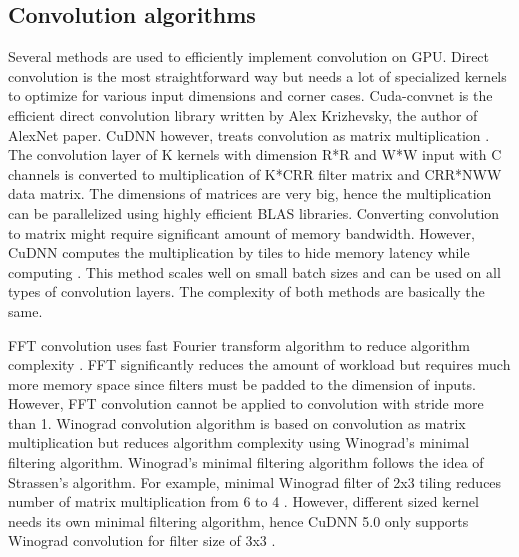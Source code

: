 \documentclass[conference]{IEEEtran}
\begin{document}
\subsection{Convolution algorithms}
Several methods are used to efficiently implement convolution on GPU.
Direct convolution is the most straightforward way but needs a lot of specialized kernels to optimize for various input dimensions and corner cases.
Cuda-convnet \cite{} is the efficient direct convolution library written by Alex Krizhevsky, the author of AlexNet paper.
CuDNN however, treats convolution as matrix multiplication \cite{}.
The convolution layer of K kernels with dimension R*R and W*W input with C channels is converted to multiplication of K*CRR filter matrix and CRR*NWW data matrix.
The dimensions of matrices are very big, hence the multiplication can be parallelized using highly efficient BLAS libraries.
Converting convolution to matrix might require significant amount of memory bandwidth.
However, CuDNN computes the multiplication by tiles to hide memory latency while computing \cite{}.
This method scales well on small batch sizes and can be used on all types of convolution layers.
The complexity of both methods are basically the same.

FFT convolution uses fast Fourier transform algorithm to reduce algorithm complexity \cite{}.
FFT significantly reduces the amount of workload but requires much more memory space since filters must be padded to the dimension of inputs.
However, FFT convolution cannot be applied to convolution with stride more than 1.
Winograd convolution algorithm is based on convolution as matrix multiplication but reduces algorithm complexity using Winograd's minimal filtering algorithm.
Winograd’s minimal filtering algorithm follows the idea of Strassen’s algorithm.
For example, minimal Winograd filter of 2x3 tiling reduces number of matrix multiplication from 6 to 4 \cite{}.
However, different sized kernel needs its own minimal filtering algorithm, hence CuDNN 5.0 only supports Winograd convolution for filter size of 3x3 \cite{}.
\end{document}
